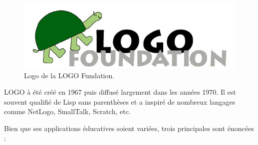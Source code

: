 \begin{figure}[H]
  \centering
  \includegraphics[width=.5\textwidth]{../resources/illustrations/logo_logo}
  \caption{Logo de la LOGO Fundation.}
\end{figure}

LOGO à été créé en 1967 puis diffusé largement dans les années 1970. Il est souvent qualifié de \og Lisp sans parenthèses \fg{} et a inspiré de nombreux langages comme NetLogo, SmallTalk, Scratch, etc.

Bien que ses applications éducatives soient variées, trois principales sont énoncées :

